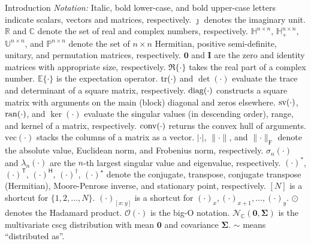 \documentclass[journal]{IEEEtran}
\begin{document}
\begin{section}{Introduction}
	\emph{Notation:}
	Italic, bold lower-case, and bold upper-case letters indicate scalars, vectors and matrices, respectively.
	$\jmath$ denotes the imaginary unit.
	$\mathbb{R}$ and $\mathbb{C}$ denote the set of real and complex numbers, respectively.
	$\mathbb{H}^{n \times n}$, $\mathbb{H}_+^{n \times n}$, $\mathbb{U}^{n \times n}$, and $\mathbb{P}^{n \times n}$ denote the set of $n \times n$ Hermitian, positive semi-definite, unitary, and permutation matrices, respectively.
	$\mathbf{0}$ and $\mathbf{I}$ are the zero and identity matrices with appropriate size, respectively.
	$\Re\{\cdot\}$ takes the real part of a complex number.
	$\mathbb{E}\{\cdot\}$ is the expectation operator.
	$\operatorname{tr}(\cdot)$ and $\det(\cdot)$ evaluate the trace and determinant of a square matrix, respectively.
	$\operatorname{diag}(\cdot)$ constructs a square matrix with arguments on the main (block) diagonal and zeros elsewhere.
	$\operatorname{sv}(\cdot)$, $\operatorname{ran}(\cdot)$, and $\ker(\cdot)$ evaluate the singular values (in descending order), range, and kernel of a matrix, respectively.
	$\operatorname{conv}(\cdot)$ returns the convex hull of arguments.
	$\mathrm{vec}(\cdot)$ stacks the columns of a matrix as a vector.
	$\lvert \cdot \rvert$, $\lVert \cdot \rVert$, and $\lVert \cdot \rVert _\mathrm{F}$ denote the absolute value, Euclidean norm, and Frobenius norm, respectively.
	$\sigma_n(\cdot)$ and $\lambda_n(\cdot)$ are the $n$-th largest singular value and eigenvalue, respectively.
	$(\cdot)^*$, $(\cdot)^\mathsf{T}$, $(\cdot)^\mathsf{H}$, $(\cdot)^\dagger$, $(\cdot)^{\star}$ denote the conjugate, transpose, conjugate transpose (Hermitian), Moore-Penrose inverse, and stationary point, respectively.
	$[N]$ is a shortcut for $\{1,2,\ldots,N\}$.
	$(\cdot)_{[x:y]}$ is a shortcut for $(\cdot)_x,(\cdot)_{x+1},\ldots,(\cdot)_y$.
	$\odot$ denotes the Hadamard product.
	$\mathcal{O}(\cdot)$ is the big-O notation.
	$\mathcal{N}_{\mathbb{C}}(\mathbf{0}, \mathbf{\Sigma})$ is the multivariate \gls{cscg} distribution with mean $\mathbf{0}$ and covariance $\mathbf{\Sigma}$.
	$\sim$ means ``distributed as''.
\end{section}
\end{document}
